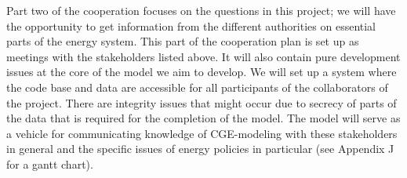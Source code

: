 Part two of the cooperation focuses on the questions in this project; we will have the opportunity to get information from the different authorities on essential parts of the energy system. This part of the cooperation plan is set up as meetings with the stakeholders listed above. It will also contain pure development issues at the core of the model we aim to develop. We will set up a system where the code base and data are accessible for all participants of the collaborators of the project. There are integrity issues that might occur due to secrecy of parts of the data that is required for the completion of the model. The model will serve as a vehicle for communicating knowledge of CGE-modeling with these stakeholders in general and the specific issues of energy policies in particular (see Appendix J for a gantt chart).
